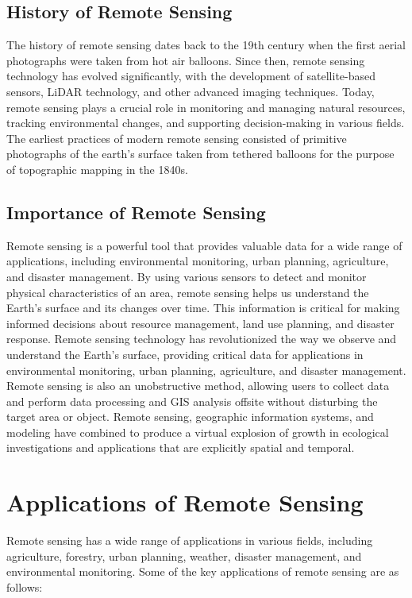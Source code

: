 \documentclass[conference]{IEEEtran}
\begin{document}
\subsection{History of Remote Sensing}
The history of remote sensing dates back to the 19th century when the first aerial photographs were taken from hot air balloons. Since then, remote sensing technology has evolved significantly, with the development of satellite-based sensors, LiDAR technology, and other advanced imaging techniques. Today, remote sensing plays a crucial role in monitoring and managing natural resources, tracking environmental changes, and supporting decision-making in various fields. The earliest practices of modern remote sensing consisted of primitive photographs of the earth’s surface taken from tethered balloons for the purpose of topographic mapping in the 1840s.

\subsection{Importance of Remote Sensing}
Remote sensing is a powerful tool that provides valuable data for a wide range of applications, including environmental monitoring, urban planning, agriculture, and disaster management. By using various sensors to detect and monitor physical characteristics of an area, remote sensing helps us understand the Earth's surface and its changes over time. This information is critical for making informed decisions about resource management, land use planning, and disaster response. Remote sensing technology has revolutionized the way we observe and understand the Earth's surface, providing critical data for applications in environmental monitoring, urban planning, agriculture, and disaster management. Remote sensing is also an unobstructive method, allowing users to collect data and perform data processing and GIS analysis offsite without disturbing the target area or object. Remote sensing, geographic information systems, and modeling have combined to produce a virtual explosion of growth in ecological investigations and applications that are explicitly spatial and temporal. \cite{cohen2004landsat} 

\section{Applications of Remote Sensing}
Remote sensing has a wide range of applications in various fields, including agriculture, forestry, urban planning, weather, disaster management, and environmental monitoring. Some of the key applications of remote sensing are as follows:
\end{document}

